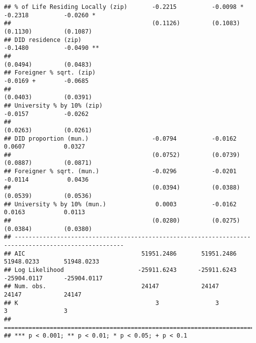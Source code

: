\documentclass[
]{article}
\begin{document}
\begin{verbatim}
## % of Life Residing Locally (zip)       -0.2215          -0.0098 *        -0.2318          -0.0260 *  
##                                        (0.1126)         (0.1083)         (0.1130)         (0.1087)   
## DID residence (zip)                                                      -0.1480          -0.0490 ** 
##                                                                          (0.0494)         (0.0483)   
## Foreigner % sqrt. (zip)                                                  -0.0169 +        -0.0685    
##                                                                          (0.0403)         (0.0391)   
## University % by 10% (zip)                                                -0.0157          -0.0262    
##                                                                          (0.0263)         (0.0261)   
## DID proportion (mun.)                  -0.0794          -0.0162           0.0607           0.0327    
##                                        (0.0752)         (0.0739)         (0.0887)         (0.0871)   
## Foreigner % sqrt. (mun.)               -0.0296          -0.0201          -0.0114           0.0436    
##                                        (0.0394)         (0.0388)         (0.0539)         (0.0536)   
## University % by 10% (mun.)              0.0003          -0.0162           0.0163           0.0113    
##                                        (0.0280)         (0.0275)         (0.0384)         (0.0380)   
## -----------------------------------------------------------------------------------------------------
## AIC                                 51951.2486       51951.2486       51948.0233       51948.0233    
## Log Likelihood                     -25911.6243      -25911.6243      -25904.0117      -25904.0117    
## Num. obs.                           24147            24147            24147            24147         
## K                                       3                3                3                3         
## =====================================================================================================
## *** p < 0.001; ** p < 0.01; * p < 0.05; + p < 0.1
\end{verbatim}
\end{document}
